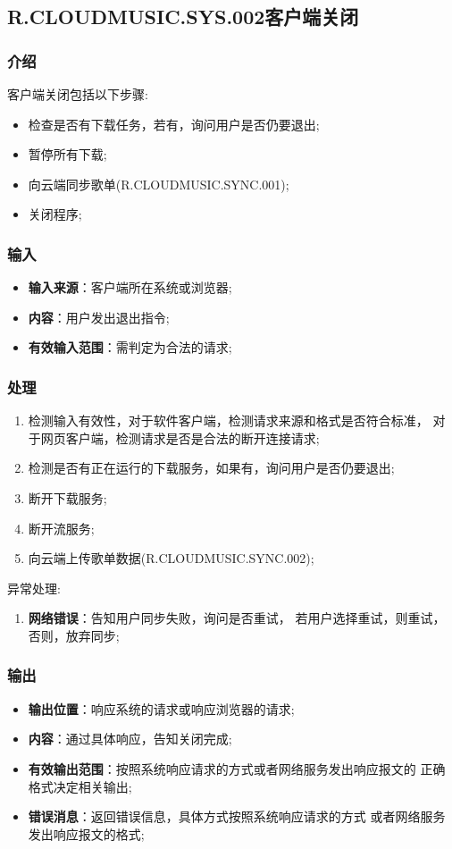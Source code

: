 \subsection{R.CLOUDMUSIC.SYS.002客户端关闭}
\subsubsection{介绍}
客户端关闭包括以下步骤:
	\begin{itemize}
		\item 检查是否有下载任务，若有，询问用户是否仍要退出;
		\item 暂停所有下载;
		\item 向云端同步歌单(R.CLOUDMUSIC.SYNC.001);
		\item 关闭程序;
	\end{itemize}
\subsubsection{输入}
	\begin{itemize}
		\item \textbf{输入来源}：客户端所在系统或浏览器;
		\item \textbf{内容}：用户发出退出指令;
		\item \textbf{有效输入范围}：需判定为合法的请求;
	\end{itemize}
\subsubsection{处理}
	\begin{enumerate}
		\item 检测输入有效性，对于软件客户端，检测请求来源和格式是否符合标准，
			对于网页客户端，检测请求是否是合法的断开连接请求;
		\item 检测是否有正在运行的下载服务，如果有，询问用户是否仍要退出;
		\item 断开下载服务;
		\item 断开流服务;
		\item 向云端上传歌单数据(R.CLOUDMUSIC.SYNC.002);
	\end{enumerate}
	\noindent 异常处理:
	\begin{enumerate}
		\item \textbf{网络错误}：告知用户同步失败，询问是否重试，
			若用户选择重试，则重试，否则，放弃同步;
	\end{enumerate}
\subsubsection{输出}
\begin{itemize}
	\item \textbf{输出位置}：响应系统的请求或响应浏览器的请求;
	\item \textbf{内容}：通过具体响应，告知关闭完成;
	\item \textbf{有效输出范围}：按照系统响应请求的方式或者网络服务发出响应报文的
		正确格式决定相关输出;
	\item \textbf{错误消息}：返回错误信息，具体方式按照系统响应请求的方式
		或者网络服务发出响应报文的格式;
\end{itemize}

